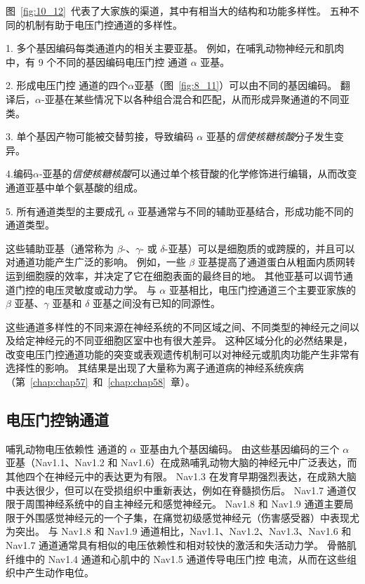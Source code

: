 图~\ref{fig:10_12}~代表了大家族的渠道，其中有相当大的结构和功能多样性。
五种不同的机制有助于电压门控通道的多样性。


1. 多个基因编码每类通道内的相关主要亚基。
例如，在哺乳动物神经元和肌肉中，有 9 个不同的基因编码电压门控  通道 $\alpha$ 亚基。


2. 形成电压门控  通道的四个$\alpha$亚基（图~\ref{fig:8_11}）可以由不同的基因编码。
翻译后，$\alpha$-亚基在某些情况下以各种组合混合和匹配，从而形成异聚通道的不同亚类。


3. 单个基因产物可能被交替剪接，导致编码 $\alpha$ 亚基的\textit{信使核糖核酸}分子发生变异。


4.编码$\alpha$-亚基的\textit{信使核糖核酸}可以通过单个核苷酸的化学修饰进行编辑，从而改变通道亚基中单个氨基酸的组成。


5. 所有通道类型的主要成孔 $\alpha$ 亚基通常与不同的辅助亚基结合，形成功能不同的通道类型。


这些辅助亚基（通常称为 $\beta$-、$\gamma$- 或 $\delta$-亚基）可以是细胞质的或跨膜的，并且可以对通道功能产生广泛的影响。
例如，一些 $\beta$ 亚基提高了通道蛋白从粗面内质网转运到细胞膜的效率，并决定了它在细胞表面的最终目的地。
其他亚基可以调节通道门控的电压灵敏度或动力学。
与 $\alpha$ 亚基相比，电压门控通道三个主要亚家族的 $\beta$ 亚基、$\gamma$ 亚基和 $\delta$ 亚基之间没有已知的同源性。


这些通道多样性的不同来源在神经系统的不同区域之间、不同类型的神经元之间以及给定神经元的不同亚细胞区室中也有很大差异。
这种区域分化的必然结果是，改变电压门控通道功能的突变或表观遗传机制可以对神经元或肌肉功能产生非常有选择性的影响。
其结果是出现了大量称为离子通道病的神经系统疾病（第~\ref{chap:chap57}~和~\ref{chap:chap58}~章）。



\subsection{电压门控钠通道}

哺乳动物电压依赖性  通道的 $\alpha$ 亚基由九个基因编码。
由这些基因编码的三个 $\alpha$ 亚基（Nav1.1、Nav1.2 和 Nav1.6）在成熟哺乳动物大脑的神经元中广泛表达，而其他四个在神经元中的表达更为有限。
Nav1.3 在发育早期强烈表达，在成熟大脑中表达很少，但可以在受损组织中重新表达，例如在脊髓损伤后。
Nav1.7 通道仅限于周围神经系统中的自主神经元和感觉神经元。
Nav1.8 和 Nav1.9 通道主要局限于外围感觉神经元的一个子集，在痛觉初级感觉神经元（伤害感受器）中表现尤为突出。
与 Nav1.8 和 Nav1.9 通道相比，Nav1.1、Nav1.2、Nav1.3、Nav1.6 和 Nav1.7 通道通常具有相似的电压依赖性和相对较快的激活和失活动力学。 
骨骼肌纤维中的 Nav1.4 通道和心肌中的 Nav1.5 通道传导电压门控  电流，从而在这些组织中产生动作电位。


